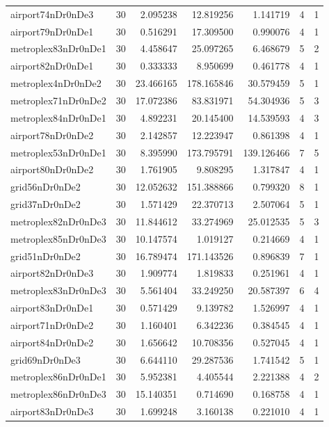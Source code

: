 \documentclass[../../../thesis.tex]{subfiles}
\begin{document}
\begin{longtable}{|l|r|r|r|r|r|r|}
airport74nDr0nDe3 & 30 & 2.095238 & 12.819256 & 1.141719 & 4 & 1 \\
airport79nDr0nDe1 & 30 & 0.516291 & 17.309500 & 0.990076 & 4 & 1 \\
metroplex83nDr0nDe1 & 30 & 4.458647 & 25.097265 & 6.468679 & 5 & 2 \\
airport82nDr0nDe1 & 30 & 0.333333 & 8.950699 & 0.461778 & 4 & 1 \\
metroplex4nDr0nDe2 & 30 & 23.466165 & 178.165846 & 30.579459 & 5 & 1 \\
metroplex71nDr0nDe2 & 30 & 17.072386 & 83.831971 & 54.304936 & 5 & 3 \\
metroplex84nDr0nDe1 & 30 & 4.892231 & 20.145400 & 14.539593 & 4 & 3 \\
airport78nDr0nDe2 & 30 & 2.142857 & 12.223947 & 0.861398 & 4 & 1 \\
metroplex53nDr0nDe1 & 30 & 8.395990 & 173.795791 & 139.126466 & 7 & 5 \\
airport80nDr0nDe2 & 30 & 1.761905 & 9.808295 & 1.317847 & 4 & 1 \\
grid56nDr0nDe2 & 30 & 12.052632 & 151.388866 & 0.799320 & 8 & 1 \\
grid37nDr0nDe2 & 30 & 1.571429 & 22.370713 & 2.507064 & 5 & 1 \\
metroplex82nDr0nDe3 & 30 & 11.844612 & 33.274969 & 25.012535 & 5 & 3 \\
metroplex85nDr0nDe3 & 30 & 10.147574 & 1.019127 & 0.214669 & 4 & 1 \\
grid51nDr0nDe2 & 30 & 16.789474 & 171.143526 & 0.896839 & 7 & 1 \\
airport82nDr0nDe3 & 30 & 1.909774 & 1.819833 & 0.251961 & 4 & 1 \\
metroplex83nDr0nDe3 & 30 & 5.561404 & 33.249250 & 20.587397 & 6 & 4 \\
airport83nDr0nDe1 & 30 & 0.571429 & 9.139782 & 1.526997 & 4 & 1 \\
airport71nDr0nDe2 & 30 & 1.160401 & 6.342236 & 0.384545 & 4 & 1 \\
airport84nDr0nDe2 & 30 & 1.656642 & 10.708356 & 0.527045 & 4 & 1 \\
grid69nDr0nDe3 & 30 & 6.644110 & 29.287536 & 1.741542 & 5 & 1 \\
metroplex86nDr0nDe1 & 30 & 5.952381 & 4.405544 & 2.221388 & 4 & 2 \\
metroplex86nDr0nDe3 & 30 & 15.140351 & 0.714690 & 0.168758 & 4 & 1 \\
airport83nDr0nDe3 & 30 & 1.699248 & 3.160138 & 0.221010 & 4 & 1 \\

\end{longtable}
\end{document}
